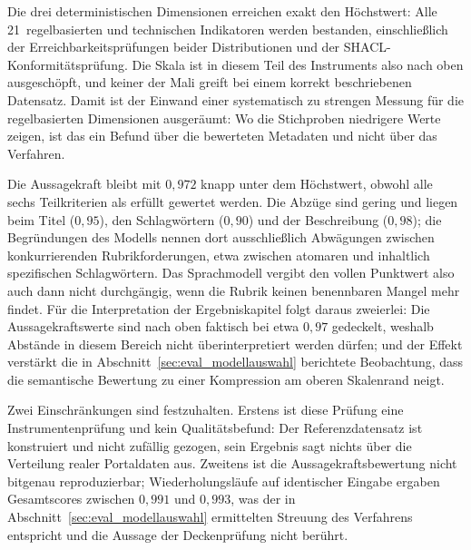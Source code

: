 Die drei deterministischen Dimensionen erreichen exakt den Höchstwert: Alle
21~regelbasierten und technischen Indikatoren werden bestanden, einschließlich der
Erreichbarkeitsprüfungen beider Distributionen und der SHACL-Konformitätsprüfung. Die
Skala ist in diesem Teil des Instruments also nach oben ausgeschöpft, und keiner der
Mali greift bei einem korrekt beschriebenen Datensatz. Damit ist der Einwand einer
systematisch zu strengen Messung für die regelbasierten Dimensionen ausgeräumt: Wo die
Stichproben niedrigere Werte zeigen, ist das ein Befund über die bewerteten Metadaten
und nicht über das Verfahren.

Die Aussagekraft bleibt mit $0{,}972$ knapp unter dem Höchstwert, obwohl alle sechs
Teilkriterien als erfüllt gewertet werden. Die Abzüge sind gering und liegen beim
Titel ($0{,}95$), den Schlagwörtern ($0{,}90$) und der Beschreibung ($0{,}98$); die
Begründungen des Modells nennen dort ausschließlich Abwägungen zwischen
konkurrierenden Rubrikforderungen, etwa zwischen atomaren und inhaltlich
spezifischen Schlagwörtern. Das Sprachmodell vergibt den vollen Punktwert
also auch dann nicht durchgängig, wenn die Rubrik keinen benennbaren Mangel mehr
findet. Für die Interpretation der Ergebniskapitel folgt daraus zweierlei: Die
Aussagekraftswerte sind nach oben faktisch bei etwa $0{,}97$ gedeckelt, weshalb
Abstände in diesem Bereich nicht überinterpretiert werden dürfen; und der Effekt
verstärkt die in Abschnitt~\ref{sec:eval_modellauswahl} berichtete Beobachtung, dass die semantische Bewertung
zu einer Kompression am oberen Skalenrand neigt.

Zwei Einschränkungen sind festzuhalten. Erstens ist diese Prüfung eine
Instrumentenprüfung und kein Qualitätsbefund: Der Referenzdatensatz ist konstruiert und
nicht zufällig gezogen, sein Ergebnis sagt nichts über die Verteilung realer
Portaldaten aus. Zweitens ist die Aussagekraftsbewertung nicht bitgenau reproduzierbar;
Wiederholungsläufe auf identischer Eingabe ergaben Gesamtscores zwischen $0{,}991$ und
$0{,}993$, was der in Abschnitt~\ref{sec:eval_modellauswahl} ermittelten Streuung des Verfahrens entspricht und
die Aussage der Deckenprüfung nicht berührt.

%
%
